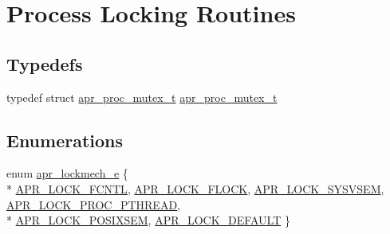 \hypertarget{group__apr__proc__mutex}{}\section{Process Locking Routines}
\label{group__apr__proc__mutex}
\subsection*{Typedefs}
\begin{DoxyCompactItemize}
\item 
typedef struct \hyperlink{group__apr__proc__mutex_ga0fae3a1ab686cd1f252c6062e4c97bd2}{apr\+\_\+proc\+\_\+mutex\+\_\+t} \hyperlink{group__apr__proc__mutex_ga0fae3a1ab686cd1f252c6062e4c97bd2}{apr\+\_\+proc\+\_\+mutex\+\_\+t}
\end{DoxyCompactItemize}
\subsection*{Enumerations}
\begin{DoxyCompactItemize}
\item 
enum \hyperlink{group__apr__proc__mutex_ga75dd95a48a1e855a87b509b522746ed4}{apr\+\_\+lockmech\+\_\+e} \{ \\*
\hyperlink{group__apr__proc__mutex_gga75dd95a48a1e855a87b509b522746ed4ad9dad69d83d1e112054ad21a7e4e16b3}{A\+P\+R\+\_\+\+L\+O\+C\+K\+\_\+\+F\+C\+N\+TL}, 
\hyperlink{group__apr__proc__mutex_gga75dd95a48a1e855a87b509b522746ed4a1d06f73a37dae31233299401c9594b41}{A\+P\+R\+\_\+\+L\+O\+C\+K\+\_\+\+F\+L\+O\+CK}, 
\hyperlink{group__apr__proc__mutex_gga75dd95a48a1e855a87b509b522746ed4a642536695bd4c233761a15d48b1d6487}{A\+P\+R\+\_\+\+L\+O\+C\+K\+\_\+\+S\+Y\+S\+V\+S\+EM}, 
\hyperlink{group__apr__proc__mutex_gga75dd95a48a1e855a87b509b522746ed4abd5e7cca2c9f6023b541131f3841057a}{A\+P\+R\+\_\+\+L\+O\+C\+K\+\_\+\+P\+R\+O\+C\+\_\+\+P\+T\+H\+R\+E\+AD}, 
\\*
\hyperlink{group__apr__proc__mutex_gga75dd95a48a1e855a87b509b522746ed4a6d65d9d745e13d8759bd8f1057f27041}{A\+P\+R\+\_\+\+L\+O\+C\+K\+\_\+\+P\+O\+S\+I\+X\+S\+EM}, 
\hyperlink{group__apr__proc__mutex_gga75dd95a48a1e855a87b509b522746ed4ae91fb435c45216bcf84f506db99d0f19}{A\+P\+R\+\_\+\+L\+O\+C\+K\+\_\+\+D\+E\+F\+A\+U\+LT}
 \}
\end{DoxyCompactItemize}
